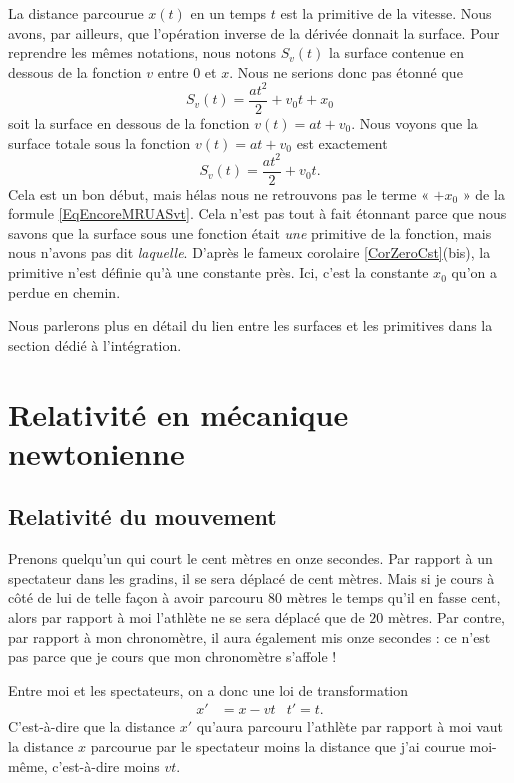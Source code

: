 La distance parcourue \( x(t)\) en un temps \( t\) est la primitive de la vitesse. Nous avons, par ailleurs, que l'opération inverse de la dérivée donnait la surface. Pour reprendre les mêmes notations, nous notons \( S_v(t)\) la surface contenue en dessous de la fonction \( v\) entre \( 0\) et \( x\). Nous ne serions donc pas étonné que
\begin{equation}        \label{EqEncoreMRUASvt}
	S_v(t) = \frac{ at^2 }{ 2 }+v_0t+x_0
\end{equation}
soit la surface en dessous de la fonction \( v(t)=at+v_0\). Nous voyons que la surface totale sous la fonction \( v(t)=at+v_0\) est exactement
\begin{equation}
	S_v(t)=\frac{ at^2 }{ 2 }+v_0t.
\end{equation}
Cela est un bon début, mais hélas nous ne retrouvons pas le terme « \( +x_0\) » de la formule \eqref{EqEncoreMRUASvt}. Cela n'est pas tout à fait étonnant parce que nous savons que la surface sous une fonction était \emph{une} primitive de la fonction, mais nous n'avons pas dit \emph{laquelle}. D'après le fameux corolaire \ref{CorZeroCst}(bis), la primitive n'est définie qu'à une constante près. Ici, c'est la constante \( x_0\) qu'on a perdue en chemin.

Nous parlerons plus en détail du lien entre les surfaces et les primitives dans la section dédié à l'intégration.

\section{Relativité en mécanique newtonienne}

\subsection{Relativité du mouvement}

Prenons quelqu'un qui court le cent mètres en onze secondes. Par rapport à un spectateur dans les gradins, il se sera déplacé de cent mètres. Mais si je cours à côté de lui de telle façon à avoir parcouru \( 80\) mètres le temps qu'il en fasse cent, alors par rapport à moi l'athlète ne se sera déplacé que de \( 20\) mètres. Par contre, par rapport à mon chronomètre, il aura également mis onze secondes : ce n'est pas parce que je cours que mon chronomètre s'affole !

Entre moi et les spectateurs, on a donc une loi de transformation
\begin{align}		\label{EqTransGal}
	x' & =x-vt & t'=t.
\end{align}
C'est-à-dire que la distance \( x'\) qu'aura parcouru l'athlète par rapport à moi vaut la distance \( x\) parcourue par le spectateur moins la distance que j'ai courue moi-même, c'est-à-dire moins \( vt\).

